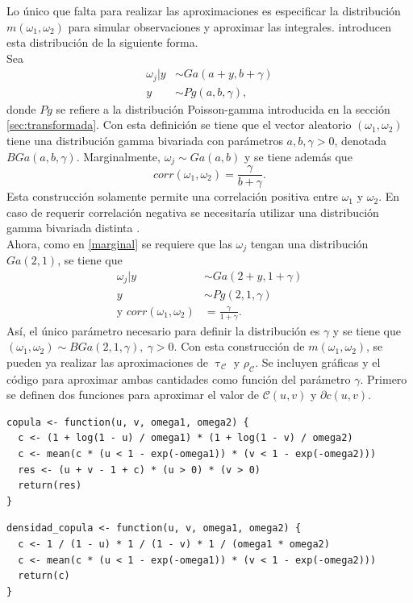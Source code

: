 \documentclass[11pt,a4paper]{article}
\newcommand{\C}{\mathcal{C}}
\begin{document}
Lo único que falta para realizar las aproximaciones es especificar la distribución $m(\omega_1, \omega_2)$ para simular observaciones y aproximar las integrales. \citet{nieto} introducen esta distribución de la siguiente forma.\\

Sea
\begin{align*}
\omega_j | y &\sim Ga(a + y, b + \gamma)\\
y &\sim Pg(a, b, \gamma),
\end{align*}
donde $Pg$ se refiere a la distribución Poisson-gamma introducida en la sección \ref{sec:transformada}. Con esta definición se tiene que el vector aleatorio $(\omega_1, \omega_2)$ tiene una distribución gamma bivariada con parámetros $a, b, \gamma > 0$, denotada $BGa(a, b, \gamma)$. Marginalmente, $\omega_j \sim Ga(a, b)$ y se tiene además que $$corr(\omega_1, \omega_2) = \frac{\gamma}{b + \gamma}.$$ Esta construcción solamente permite una correlación positiva entre $\omega_1$ y $\omega_2$. En caso de requerir correlación negativa se necesitaría utilizar una distribución gamma bivariada distinta \citep{nieto}.\\

Ahora, como en \eqref{marginal} se requiere que las $\omega_j$ tengan una distribución $Ga(2, 1)$, se tiene que 
\begin{align} \label{eq_omegas}
\omega_j | y &\sim Ga(2 + y, 1 + \gamma) \nonumber\\
y &\sim Pg(2, 1, \gamma)\\
\text{y } corr(\omega_1, \omega_2) &= \frac{\gamma}{1 + \gamma}. \nonumber
\end{align}
Así, el único parámetro necesario para definir la distribución es $\gamma$ y se tiene que $(\omega_1, \omega_2) \sim BGa(2, 1, \gamma), \ \gamma >0$. Con esta construcción de $m(\omega_1, \omega_2)$, se pueden ya realizar las aproximaciones de $\uptau_\C$ y $\rho_\C$. Se incluyen gráficas y el código para aproximar ambas cantidades como función del parámetro $\gamma$. Primero se definen dos funciones para aproximar el valor de $\C(u, v)$ y $\partial c(u, v)$.

\begin{lstlisting}
copula <- function(u, v, omega1, omega2) {
  c <- (1 + log(1 - u) / omega1) * (1 + log(1 - v) / omega2)
  c <- mean(c * (u < 1 - exp(-omega1)) * (v < 1 - exp(-omega2)))
  res <- (u + v - 1 + c) * (u > 0) * (v > 0)
  return(res)
}
\end{lstlisting} 

\begin{lstlisting}
densidad_copula <- function(u, v, omega1, omega2) {
  c <- 1 / (1 - u) * 1 / (1 - v) * 1 / (omega1 * omega2)
  c <- mean(c * (u < 1 - exp(-omega1)) * (v < 1 - exp(-omega2)))
  return(c)
}
\end{lstlisting}\leavevmode\newline
\end{document}
